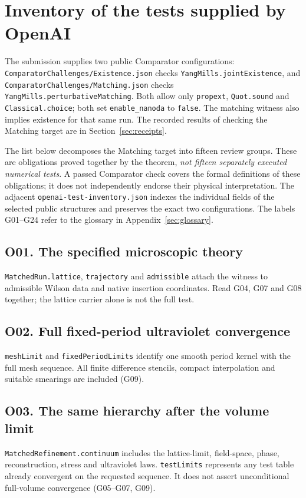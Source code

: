 \documentclass[11pt]{article}
\newcommand{\code}[1]{{\small\nolinkurl{#1}}}
\begin{document}

\section{Inventory of the tests supplied by OpenAI}
\label{sec:inventory}

The submission supplies two public Comparator configurations:
\code{ComparatorChallenges/Existence.json} checks
\code{YangMills.jointExistence}, and
\code{ComparatorChallenges/Matching.json} checks
\code{YangMills.perturbativeMatching}. Both allow only
\code{propext}, \code{Quot.sound} and \code{Classical.choice};
both set \code{enable_nanoda} to \code{false}.
The matching witness also implies existence for that same run.
The recorded results of checking the Matching target are in
Section~\ref{sec:receipts}.

The list below decomposes the Matching target into fifteen review
groups. These are obligations proved together by the theorem,
\emph{not fifteen separately executed numerical tests}. A passed
Comparator check covers the formal definitions of these obligations;
it does not independently endorse their physical interpretation.
The adjacent \code{openai-test-inventory.json} indexes the individual
fields of the selected public structures and preserves the exact
two configurations. The labels G01--G24 refer to the glossary in
Appendix~\ref{sec:glossary}.

\subsection*{O01. The specified microscopic theory}
\code{MatchedRun.lattice}, \code{trajectory} and \code{admissible}
attach the witness to admissible Wilson data and native insertion coordinates.
Read G04, G07 and G08 together; the lattice carrier alone is not the full test.

\subsection*{O02. Full fixed-period ultraviolet convergence}
\code{meshLimit} and \code{fixedPeriodLimits} identify one smooth
period kernel with the full mesh sequence. All finite difference
stencils, compact interpolation and suitable smearings are included (G09).

\subsection*{O03. The same hierarchy after the volume limit}
\code{MatchedRefinement.continuum} includes the lattice-limit,
field-space, phase, reconstruction, stress and ultraviolet laws.
\code{testLimits} represents any test table already convergent
on the requested sequence. It does not assert unconditional full-volume
convergence (G05--G07, G09).
\end{document}
